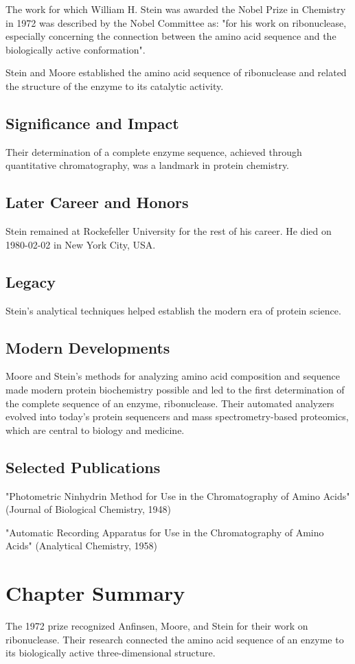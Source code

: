 The work for which William H. Stein was awarded the Nobel Prize in Chemistry in 1972 was described by the Nobel Committee as: "for his work on ribonuclease, especially concerning the connection between the amino acid sequence and the biologically active conformation".

Stein and Moore established the amino acid sequence of ribonuclease and related the structure of the enzyme to its catalytic activity.

\subsection*{Significance and Impact}

Their determination of a complete enzyme sequence, achieved through quantitative chromatography, was a landmark in protein chemistry.

\subsection*{Later Career and Honors}

Stein remained at Rockefeller University for the rest of his career. He died on 1980-02-02 in New York City, USA.

\subsection*{Legacy}

Stein's analytical techniques helped establish the modern era of protein science.

\subsection*{Modern Developments}

Moore and Stein's methods for analyzing amino acid composition and sequence made modern protein biochemistry possible and led to the first determination of the complete sequence of an enzyme, ribonuclease. Their automated analyzers evolved into today's protein sequencers and mass spectrometry-based proteomics, which are central to biology and medicine.

\subsection*{Selected Publications}

"Photometric Ninhydrin Method for Use in the Chromatography of Amino Acids" (Journal of Biological Chemistry, 1948)

"Automatic Recording Apparatus for Use in the Chromatography of Amino Acids" (Analytical Chemistry, 1958)

\clearpage

\section*{Chapter Summary}

The 1972 prize recognized Anfinsen, Moore, and Stein for their work on ribonuclease. Their research connected the amino acid sequence of an enzyme to its biologically active three-dimensional structure.

